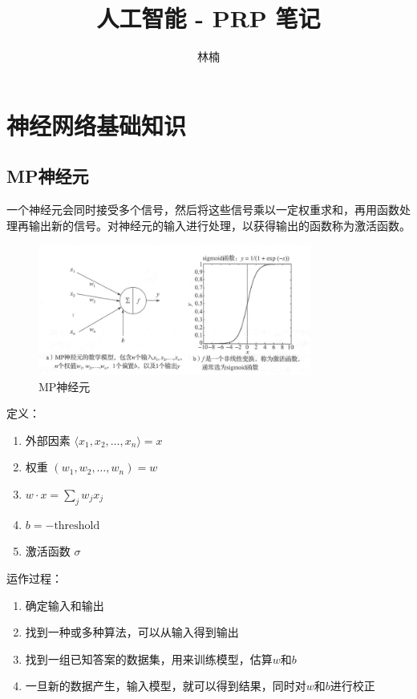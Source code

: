 \documentclass[cn,hazy,blue,11pt,normal]{elegantnote}
\title{人工智能 - PRP 笔记}
\author{林楠}
\institute{Shanghai Jiao Tong University}
\date{\zhtoday}
\begin{document}
\maketitle

\newpage
\tableofcontents
\newpage

\section{神经网络基础知识}

\subsection{MP神经元}


一个神经元会同时接受多个信号，然后将这些信号乘以一定权重求和，再用函数处理再输出新的信号。对神经元的输入进行处理，以获得输出的函数称为激活函数。
\begin{figure}[htpb] %
    \centering
    \includegraphics[width=0.8\textwidth]{./fig/MP神经元.png}
    \caption{MP神经元}
    \label{fig:MP神经元}
\end{figure}

定义：

\begin{enumerate}
    \item 外部因素 $\langle x_1,x_2,\ldots,x_n \rangle =x$
    \item 权重 $(w_1,w_2,\ldots,w_n) = w$
    \item $w\cdot x = \sum_j w_jx_j$
    \item $b=-\text{threshold}$
    \item 激活函数 $\sigma$
\end{enumerate}

运作过程：
\begin{enumerate}
    \item 确定输入和输出
    \item 找到一种或多种算法，可以从输入得到输出
    \item 找到一组已知答案的数据集，用来训练模型，估算$w$和$b$
    \item 一旦新的数据产生，输入模型，就可以得到结果，同时对$w$和$b$进行校正
\end{enumerate}
\end{document}
